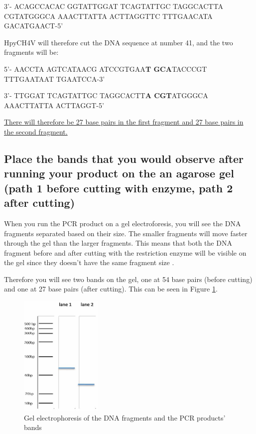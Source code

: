 3'- ACAGCCACAC GGTATTGGAT TCAGTATTGC TAGGCACTTA CGTATGGGCA AAACTTATTA ACTTAGGTTC TTTGAACATA GACATGAACT-5'
\vspace{1em}

HpyCH4V will therefore cut the DNA sequence at number 41, and the two fragments will be:

5'- AACCTA AGTCATAACG ATCCGTGAA\textbf{T GCA}TACCCGT TTTGAATAAT TGAATCCA-3'

3'- TTGGAT TCAGTATTGC TAGGCACTT\textbf{A CGT}ATGGGCA AAACTTATTA ACTTAGGT-5'

\vspace{1em}   
\underline{There will therefore be 27 base pairs in the first fragment and 27 base pairs in the second fragment.}

\subsection{Place the bands that you would observe after running your product on the an agarose gel (path 1 before cutting with enzyme, path 2 after cutting)}

When you run the PCR product on a gel electroforesis, you will see the DNA fragments separated based on their size. The smaller fragments will move faster through the gel than the larger fragments. This means that both the DNA fragment before and after cutting with the restriction enzyme will be visible on the gel since they doesn't have the same fragment size   .

Therefore you will see two bands on the gel, one at 54 base pairs (before cutting) and one at 27 base pairs (after cutting).
This can be seen in Figure \ref{fig:Exercise2Gel}.
\clearpage
\begin{figure}[t]
    \centering
    \includegraphics[angle=270, width=0.35\textwidth]{Figures/Exc2Gel.JPG}
    \caption{Gel electrophoresis of the DNA fragments and the PCR products' bands}
    \label{fig:Exercise2Gel}
\end{figure}

